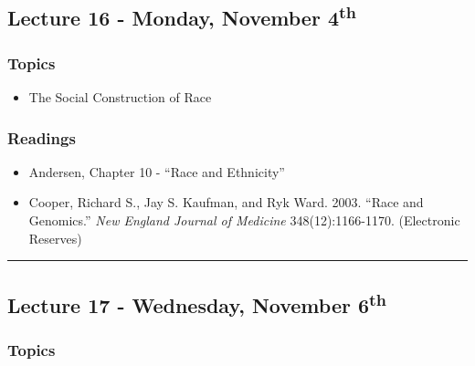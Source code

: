 \documentclass[]{book}
\providecommand{\tightlist}{%
  \setlength{\itemsep}{0pt}\setlength{\parskip}{0pt}}
\begin{document}
\hypertarget{lecture-16---monday-november-4th}{%
\subsection*{\texorpdfstring{Lecture 16 - Monday, November 4\textsuperscript{th}}{Lecture 16 - Monday, November 4th}}\label{lecture-16---monday-november-4th}}

\hypertarget{topics-20}{%
\subsubsection*{Topics}\label{topics-20}}

\begin{itemize}
\tightlist
\item
  The Social Construction of Race
\end{itemize}

\hypertarget{readings-18}{%
\subsubsection*{Readings}\label{readings-18}}

\begin{itemize}
\tightlist
\item
  Andersen, Chapter 10 - ``Race and Ethnicity''
\item
  Cooper, Richard S., Jay S. Kaufman, and Ryk Ward. 2003. ``Race and Genomics.'' \emph{New England Journal of Medicine} 348(12):1166-1170. (Electronic Reserves)
\end{itemize}

\begin{center}\rule{0.5\linewidth}{\linethickness}\end{center}

\hypertarget{lecture-17---wednesday-november-6th}{%
\subsection*{\texorpdfstring{Lecture 17 - Wednesday, November 6\textsuperscript{th}}{Lecture 17 - Wednesday, November 6th}}\label{lecture-17---wednesday-november-6th}}

\hypertarget{topics-21}{%
\subsubsection*{Topics}\label{topics-21}}
\end{document}
